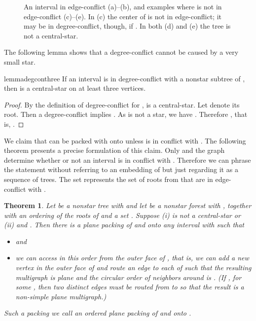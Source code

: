 \documentclass[11pt,a4paper,colorlinks=true,urlcolor=blue,citecolor=red]{article}
\theoremstyle{plain}
\newtheorem{theorem}{Theorem}
\begin{document}
\begin{figure}[htbp]
  \centering {}\hfil
  \hfil
  \hfil
  \hfil
  \hfil
  \caption{An interval  in edge-conflict (a)--(b), and examples
    where  is not in edge-conflict (c)--(e). In (c) the center of
     is not in edge-conflict; it may be in degree-conflict, though,
    if . In both (d) and (e) the tree  is
    not a central-star.\label{fig:starconflicts}}
\end{figure}



\noindent
The following lemma shows that a degree-conflict cannot be caused by a
very small star.
\begin{restatable}{lemma}{degconthree}\label{lem:degcon3}
  If an interval  is in degree-conflict with a nonstar subtree
   of , then  is a central-star on at least three
  vertices.
\end{restatable}
\begin{proof}
  By the definition of degree-conflict for ,  is
  a central-star. Let  denote its root.  Then a degree-conflict
  implies . As  is not a star, we have
  . Therefore , that is,
  .
\end{proof}

We claim that  can be packed with  onto  unless  is in
conflict with . The following theorem presents a precise formulation
of this claim. Only  and the graph  determine whether or
not an interval  is in conflict with . Therefore we can phrase
the statement without referring to an embedding of  but just
regarding it as a sequence of trees. The set  represents the set of
roots from  that are in edge-conflict with .
\begin{theorem}\label{thm:main}
  Let  be a nonstar tree with  and let  be a nonstar
  forest with , together with an ordering  of
  the  roots of  and a set
  . Suppose (i)  is not a central-star or (ii)  and
  . Then there is a plane packing  of 
  and  onto any interval  with  such that
\begin{itemize}
  \item  and
  \item we can access  in this order from the outer
    face of , that is, we can add a new vertex  in the outer
    face of  and route an edge to each of  such
    that the resulting multigraph is plane and the circular order of
    neighbors around  is . (If , for some
    , then two distinct edges must be routed from
     to  so that the result is a non-simple plane multigraph.)
  \end{itemize}
  Such a packing  we call an \emph{ordered plane packing} of 
  and  onto .
\end{theorem}
\end{document}
